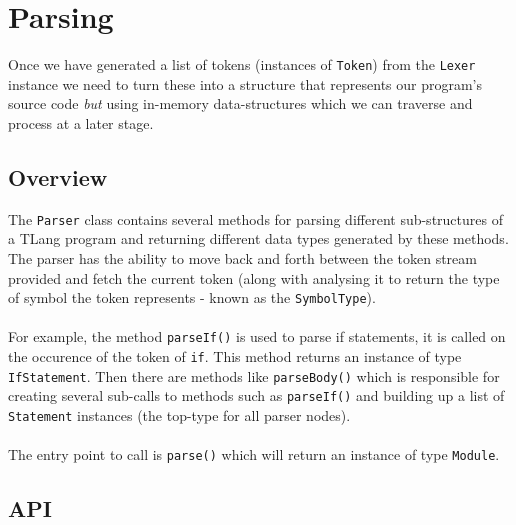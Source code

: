 
\chapter{Parsing}

Once we have generated a list of tokens (instances of \texttt{Token})
from the \texttt{Lexer} instance we need to turn these into a structure
that represents our program's source code \emph{but}\textbf{ }using
in-memory data-structures which we can traverse and process at a later
stage.

\section{Overview}

The \texttt{Parser} class contains several methods for parsing different
sub-structures of a TLang program and returning different data types
generated by these methods. The parser has the ability to move back
and forth between the token stream provided and fetch the current
token (along with analysing it to return the type of symbol the token
represents - known as the \texttt{SymbolType}).\\
\\
For example, the method \texttt{parseIf()} is used to parse if statements,
it is called on the occurence of the token of \texttt{if}. This method
returns an instance of type \texttt{IfStatement}. Then there are
methods like \texttt{parseBody()} which is responsible for creating
several sub-calls to methods such as \texttt{parseIf()} and building
up a list of \texttt{Statement} instances (the top-type for all parser
nodes).\\
\\
The entry point to call is \texttt{parse()} which will return an
instance of type \texttt{Module}.

\section{API}

